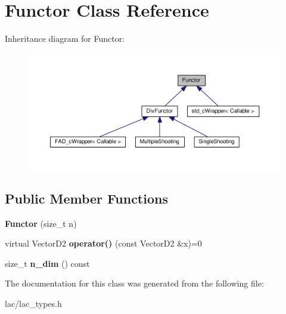 \hypertarget{classFunctor}{}\section{Functor Class Reference}
\label{classFunctor}


Inheritance diagram for Functor\+:
\nopagebreak
\begin{figure}[H]
\begin{center}
\leavevmode
\includegraphics[width=350pt]{classFunctor__inherit__graph}
\end{center}
\end{figure}
\subsection*{Public Member Functions}
\begin{DoxyCompactItemize}
\item 
\mbox{\label{classFunctor_ad1809c2a1db2ab1cd607af4b1c8aaeb0}} 
{\bfseries Functor} (size\+\_\+t n)
\item 
\mbox{\label{classFunctor_a79e7aeb507e6d8715c1dde8f5c0d598b}} 
virtual Vector\+D2 {\bfseries operator()} (const Vector\+D2 \&x)=0
\item 
\mbox{\label{classFunctor_a840b2921ae2622a4939098f530582ebc}} 
size\+\_\+t {\bfseries n\+\_\+dim} () const
\end{DoxyCompactItemize}


The documentation for this class was generated from the following file\+:\begin{DoxyCompactItemize}
\item 
lac/lac\+\_\+types.\+h\end{DoxyCompactItemize}
